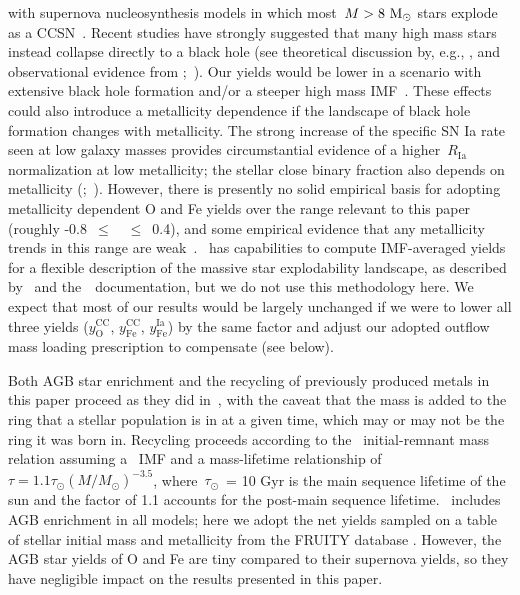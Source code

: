 \documentclass[draft2.tex]{subfiles}
\begin{document}
with supernova nucleosynthesis models in which most~$M > 8~\text{M}_\odot$ stars explode 
as a CCSN~\citep[e.g.][]{Chieffi2004, Chieffi2013}. 
Recent studies have strongly suggested that many high mass stars instead 
collapse directly to a black hole (see theoretical discussion by, e.g., 
\citealp{Pejcha2015, Sukhbold2016, Ertl2016}, and observational evidence from 
\citealp*{Gerke2015};~\citealp{Adams2017, Basinger2020}). 
Our yields would be lower in a scenario with extensive black hole formation 
and/or a steeper high mass IMF~\citep{Griffith2021b}. 
These effects could also introduce a metallicity dependence if the landscape of 
black hole formation changes with metallicity. 
The strong increase of the specific SN Ia rate seen at low galaxy masses 
\citep{Brown2019} provides circumstantial evidence of a higher~$R_\text{Ia}$ 
normalization at low metallicity; the stellar close binary fraction also 
depends on metallicity (\citealp{Badenes2018};~\citealp*{Moe2019}). 
However, there is presently no solid empirical basis for adopting metallicity 
dependent O and Fe yields over the range relevant to this paper (roughly 
-0.8~$\leq$~\feh~$\leq$~0.4), and some empirical evidence that any metallicity 
trends in this range are weak~\citep{Weinberg2019}. 
\vice~has capabilities to compute IMF-averaged yields for a flexible 
description of the massive star explodability landscape, as described 
by~\citet{Griffith2021b} and the~\vice~documentation, but we do not use this 
methodology here. 
We expect that most of our results would be largely unchanged if we were to 
lower all three yields ($y_\text{O}^\text{CC}$, $y_\text{Fe}^\text{CC}$, 
$y_\text{Fe}^\text{Ia}$) by the same factor and adjust our adopted outflow 
mass loading prescription to compensate (see below). 
\par 
Both AGB star enrichment and the recycling of previously produced metals in 
this paper proceed as they did in~\citet{Johnson2020}, with the caveat that the 
mass is added to the ring that a stellar population is in at a given time, 
which may or may not be the ring it was born in. 
Recycling proceeds according to the~\citet{Kalirai2008} initial-remnant mass 
relation assuming a~\citet{Kroupa2001} IMF and a mass-lifetime relationship of 
$\tau = 1.1\tau_\odot(M/M_\odot)^{-3.5}$, where~$\tau_\odot$~= 10 Gyr is the 
main sequence lifetime of the sun and the factor of 1.1 accounts for the 
post-main sequence lifetime. 
\vice~includes AGB enrichment in all models; here we adopt the net yields 
sampled on a table of stellar initial mass and metallicity from the FRUITY 
database \citep{Cristallo2011}. 
However, the AGB star yields of O and Fe are tiny compared to their 
supernova yields, so they have negligible impact on the results presented in 
this paper. 
\end{document}
